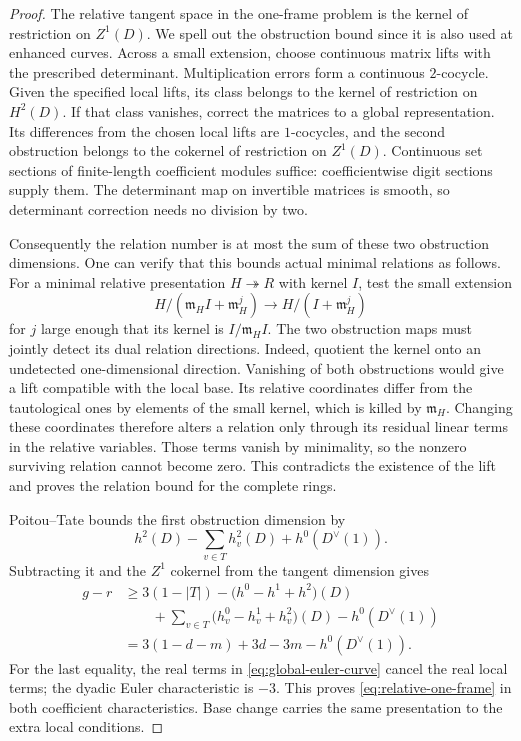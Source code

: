 \begin{proof}
The relative tangent space in the one-frame problem is the kernel of
restriction on $Z^1(D)$.  We spell out the obstruction bound since
it is also used at enhanced curves.  Across a small extension, choose
continuous matrix lifts with the prescribed determinant.
Multiplication errors form a continuous $2$-cocycle.  Given the
specified local lifts, its class belongs to the kernel of restriction
on $H^2(D)$.  If that class vanishes, correct the matrices to a global
representation.  Its differences from the chosen local lifts are
$1$-cocycles, and the second obstruction belongs to the cokernel of
restriction on $Z^1(D)$.  Continuous set sections of finite-length
coefficient modules suffice: coefficientwise digit sections supply
them.  The determinant map on invertible matrices is smooth, so
determinant correction needs no division by two.

Consequently the relation number is at most the sum of these two
obstruction dimensions.  One can verify that this bounds actual
minimal relations as follows.  For a minimal relative presentation
$H\twoheadrightarrow R$ with kernel $I$, test the small extension
\[
H/(\mathfrak m_HI+\mathfrak m_H^j)
 \longrightarrow H/(I+\mathfrak m_H^j)
\]
for $j$ large enough that its kernel is $I/\mathfrak m_HI$.
The two obstruction maps must jointly detect its dual relation
directions. Indeed, quotient the kernel onto an undetected
one-dimensional direction. Vanishing of both obstructions would give
a lift compatible with the local base. Its relative coordinates differ
from the tautological ones by elements of the small kernel, which is
killed by $\mathfrak m_H$. Changing these coordinates therefore alters
a relation only through its residual linear terms in the relative
variables. Those terms vanish by minimality, so the nonzero surviving
relation cannot become zero. This contradicts the existence of the
lift and proves the relation bound for the complete rings.

Poitou--Tate bounds the first obstruction dimension by
\[
h^2(D)-\sum_{v\in T}h^2_v(D)+h^0(D^\vee(1)).
\]
Subtracting it and the $Z^1$ cokernel from the tangent dimension gives
\begin{align*}
g-r
&\ge 3(1-|T|)
 -\bigl(h^0-h^1+h^2\bigr)(D)\\
&\qquad +\sum_{v\in T}
       \bigl(h^0_v-h^1_v+h^2_v\bigr)(D)
 -h^0(D^\vee(1))\\
&=3(1-d-m)+3d-3m-h^0(D^\vee(1)).
\end{align*}
For the last equality, the real terms in
\eqref{eq:global-euler-curve} cancel the real local terms; the dyadic
Euler characteristic is $-3$.  This proves
\eqref{eq:relative-one-frame} in both coefficient characteristics.
Base change carries the same presentation to the extra local
conditions.


\end{proof}
